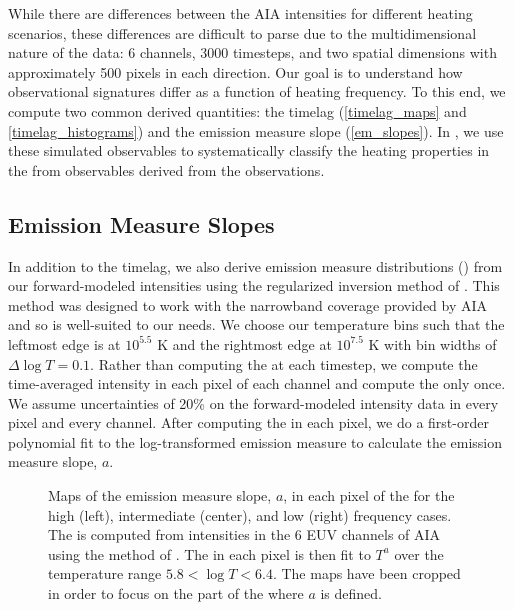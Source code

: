 While there are differences between the AIA intensities for different heating scenarios, these differences are difficult to parse due to the multidimensional nature of the data: 6 channels, 3000 timesteps, and two spatial dimensions with approximately 500 pixels in each direction. Our goal is to understand how observational signatures differ as a function of heating frequency. To this end, we compute two common derived quantities: the timelag (\autoref{timelag_maps} and \autoref{timelag_histograms}) and the emission measure slope (\autoref{em_slopes}). In , we use these simulated observables to systematically classify the heating properties in the \AR{} from observables derived from the observations.

\subsection{Emission Measure Slopes}\label{em_slopes}

In addition to the timelag, we also derive emission measure distributions (\dem{}) from our forward-modeled intensities using the regularized inversion method of \citet{hannah_differential_2012}. This method was designed to work with the narrowband coverage provided by AIA and so is well-suited to our needs. We choose our temperature bins such that the leftmost edge is at $10^{5.5}$ K and the rightmost edge at $10^{7.5}$ K with bin widths of $\Delta\log T=0.1$. Rather than computing the \dem{} at each timestep, we compute the time-averaged intensity in each pixel of each channel and compute the \dem{} only once. We assume uncertainties of 20\% on the forward-modeled intensity data in every pixel and every channel. After computing the \dem{} in each pixel, we do a first-order polynomial fit to the log-transformed emission measure to calculate the emission measure slope, $a$.

\begin{figure*}
    \caption{Maps of the emission measure slope, $a$, in each pixel of the \AR{} for the high (left), intermediate (center), and low (right) frequency cases. The \dem{} is computed from intensities in the 6 EUV channels of AIA using the method of \citet{hannah_differential_2012}. The \dem{} in each pixel is then fit to $T^a$ over the temperature range $5.8<\log{T}<6.4$. The maps have been cropped in order to focus on the part of the \AR{} where $a$ is defined.}
    \label{fig:slope_maps}
\end{figure*}

